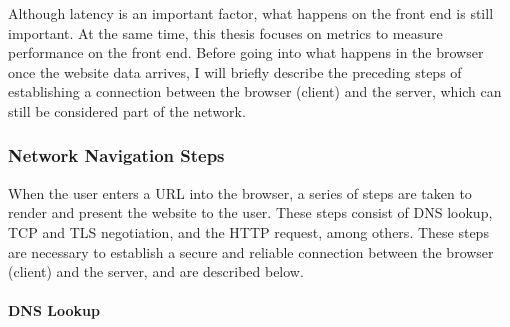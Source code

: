 
Although latency is an important factor, what happens on the front end is still important.
At the same time, this thesis focuses on metrics to measure performance on the front end.
Before going into what happens in the browser once the website data arrives, I will briefly describe the preceding steps of establishing a connection between the browser (client) and the server, which can still be considered part of the network.





\subsubsection{Network Navigation Steps} %
\label{subsubsection:network_navigation_steps}

When the user enters a URL into the browser, a series of steps are taken to render and present the website to the user.
These steps consist of DNS lookup, TCP and TLS negotiation, and the HTTP request, among others.
These steps are necessary to establish a secure and reliable connection between the browser (client) and the server, and are described below.





\paragraph{DNS Lookup} %

